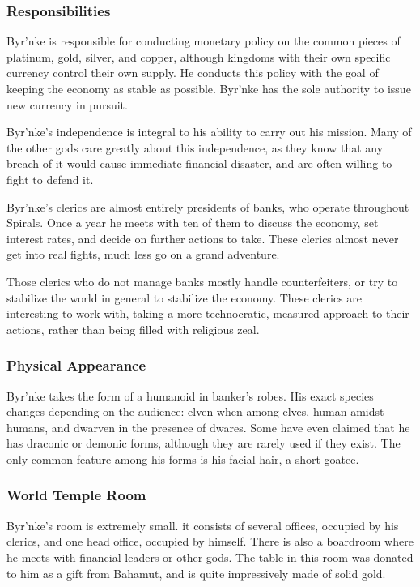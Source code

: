 \subsubsection*{Responsibilities}
Byr'nke is responsible for conducting monetary policy on the common pieces of platinum, gold, silver, and copper, although kingdoms with their own specific currency control their own supply.
He conducts this policy with the goal of keeping the economy as stable as possible.
Byr'nke has the sole authority to issue new currency in pursuit.

Byr'nke's independence is integral to his ability to carry out his mission.
Many of the other gods care greatly about this independence, as they know that any breach of it would cause immediate financial disaster, and are often willing to fight to defend it.

Byr'nke's clerics are almost entirely presidents of banks, who operate throughout Spirals.
Once a year he meets with ten of them to discuss the economy, set interest rates, and decide on further actions to take.
These clerics almost never get into real fights, much less go on a grand adventure.

Those clerics who do not manage banks mostly handle counterfeiters, or try to stabilize the world in general to stabilize the economy.
These clerics are interesting to work with, taking a more technocratic, measured approach to their actions, rather than being filled with religious zeal.

\subsubsection*{Physical Appearance}
Byr'nke takes the form of a humanoid in banker's robes.
His exact species changes depending on the audience: elven when among elves, human amidst humans, and dwarven in the presence of dwares.
Some have even claimed that he has draconic or demonic forms, although they are rarely used if they exist.
The only common feature among his forms is his facial hair, a short goatee.

\subsubsection*{World Temple Room}
Byr'nke's room is extremely small.
it consists of several offices, occupied by his clerics, and one head office, occupied by himself.
There is also a boardroom where he meets with financial leaders or other gods.
The table in this room was donated to him as a gift from Bahamut, and is quite impressively made of solid gold.


